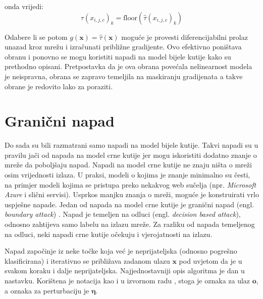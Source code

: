 \documentclass[utf8, diplomski]{fer}
\begin{document}
onda vrijedi:
\begin{equation}
	\tau (x_{i, j, c})_{k} = \text{floor}(\hat{\tau}(x_{i,j,c})_{k})
\end{equation}

Odabere li se potom $g(\boldsymbol{x}) = \hat{\tau}(\boldsymbol{x})$ moguće je provesti diferencijabilni prolaz unazad kroz mrežu i izračunati približne gradijente. Ovo efektivno poništava obranu i ponovno se mogu koristiti napadi na model bijele kutije kako su prethodno opisani. Pretpostavka da je ova obrana povećala nelinearnost modela je neispravna, obrana se zapravo temeljila na maskiranju gradijenata a takve obrane je redovito lako za poraziti.

\section{Granični napad}\label{boundary_att} Do sada su bili razmatrani samo napadi na model bijele kutije. Takvi napadi su u pravilu jači od napada na model crne kutije jer mogu iskoristiti dodatno znanje o mreže da poboljšaju napad. Napadi na model crne kutije ne znaju ništa o mreži osim vrijednosti izlaza. U praksi, modeli o kojima je znanje minimalno su česti, na primjer modeli kojima se pristupa preko nekakvog web sučelja (npr. \textit{Microsoft Azure} i slični servisi). Usprkos manjku znanja o mreži, moguće je konstruirati vrlo uspješne napade.
Jedan od napada na model crne kutije je granični napad (engl. \textit{boundary attack}) \citep{Brendel2017DecisionBasedAA}. Napad je temeljen na odluci (engl. \textit{decision based attack}), odnosno zahtijeva samo labelu na izlazu mreže. Za razliku od napada temeljenog na odluci, neki napadi crne kutije očekuju i vjerojatnosti na izlazu. \par
Napad započinje iz neke točke koja već je neprijateljska (odnosno pogrešno klasificirana) i iterativno se približava zadanom ulazu $\boldsymbol{x}$ pod uvjetom da je u svakom koraku i dalje neprijateljska. Najjednostavniji opis algoritma je dan u nastavku. Korištena je notacija kao i u izvornom radu \citep{Brendel2017DecisionBasedAA}, stoga je oznaka za ulaz $\boldsymbol{o}$, a oznaka za perturbaciju je $\boldsymbol{\eta}$.
\end{document}
